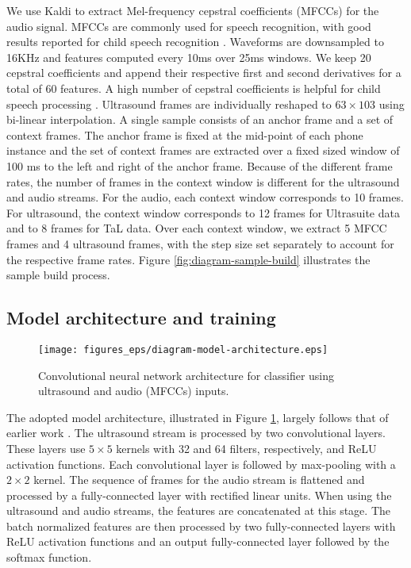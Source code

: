 We use Kaldi to extract Mel-frequency cepstral coefficients (MFCCs) for the audio signal.
MFCCs are commonly used for speech recognition, with good results reported for child speech recognition \citep{shivakumar2014improving}.
Waveforms are downsampled to 16KHz and features computed every 10ms over 25ms windows.
We keep 20 cepstral coefficients and append their respective first and second derivatives for a total of 60 features.
A high number of cepstral coefficients is helpful for child speech processing \citep{li2001automatic}.
Ultrasound frames are individually reshaped to $63\times103$ using bi-linear interpolation.
A single sample consists of an anchor frame and a set of context frames.
The anchor frame is fixed at the mid-point of each phone instance and the set of context frames are extracted over a fixed sized window of 100 ms to the left and right of the anchor frame.
Because of the different frame rates, the number of frames in the context window is different for the ultrasound and audio streams.
For the audio, each context window corresponds to 10 frames.
For ultrasound, the context window corresponds to 12 frames for Ultrasuite data and to 8 frames for TaL data.
Over each context window, we extract 5 MFCC frames and 4 ultrasound frames, with the step size set separately to account for the respective frame rates.
Figure \ref{fig:diagram-sample-build} illustrates the sample build process.


\subsection{Model architecture and training}

\begin{figure}
\texttt{[image: figures\_eps/diagram-model-architecture.eps]}
\caption{\label{fig:diagram-model-architecture}
Convolutional neural network architecture for classifier using ultrasound and audio (MFCCs) inputs.}
\end{figure}


The adopted model architecture, illustrated in Figure \ref{fig:diagram-model-architecture}, largely follows that of earlier work \citep{ribeiro2019speaker, ribeiro2019ultrasound}.
The ultrasound stream is processed by two convolutional layers.
These layers use $5\times5$ kernels with 32 and 64 filters, respectively, and ReLU activation functions.
Each convolutional layer is followed by max-pooling with a $2\times2$ kernel.
The sequence of frames for the audio stream is flattened and processed by a fully-connected layer with rectified linear units.
When using the ultrasound and audio streams, the features are concatenated at this stage.
The batch normalized features are then processed by two fully-connected layers with ReLU activation functions and an output fully-connected layer followed by the softmax function.

